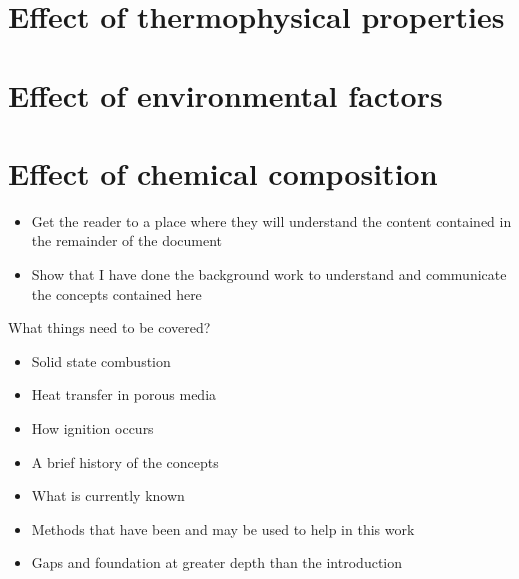     \section{Effect of thermophysical properties}
    \section{Effect of environmental factors}
    \section{Effect of chemical composition}
    \begin{itemize}
        \item Get the reader to a place where they will understand the content contained in the remainder of the document
        \item Show that I have done the background work to understand and communicate the concepts contained here
    \end{itemize}
    What things need to be covered?
    \begin{itemize}
        \item Solid state combustion
        \item Heat transfer in porous media
        \item How ignition occurs 
        \item A brief history of the concepts
        \item What is currently known
        \item Methods that have been and may be used to help in this work
        \item Gaps and foundation at greater depth than the introduction
    \end{itemize}